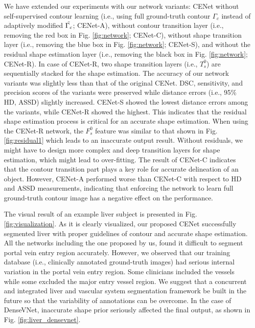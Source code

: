 \documentclass[journal]{IEEEtran}
\begin{document}
We have extended our experiments with our network variants: CENet without self-supervised contour learning (i.e., using full ground-truth contour $\Gamma_c$ instead of adaptively modified $\Tilde{\Gamma_c}$; CENet-A), without contour transition layer (i.e., removing the red box in Fig. \ref{fig:network}; CENet-C), without shape transition layer (i.e., removing the blue box in Fig. \ref{fig:network}; CENet-S), and without the residual shape estimation layer (i.e., removing the black box in Fig. \ref{fig:network}; CENet-R). In case of CENet-R, two shape transition layers (i.e., \(T^0_s\)) are sequentially stacked for the shape estimation. The accuracy of our network variants was slightly less than that of the original CENet. DSC, sensitivity, and precision scores of the variants were preserved while distance errors (i.e., 95\% HD, ASSD) slightly increased. CENet-S showed the lowest distance errors among the variants, while CENet-R showed the highest. This indicates that the residual shape estimation process is critical for an accurate shape estimation. When using the CENet-R network, the \(F^0_s\) feature was similar to that shown in Fig. \ref{fig:residual1} which leads to an inaccurate output result. Without residuals, we might have to design more complex and deep transition layers for shape estimation, which might lead to over-fitting. The result of CENet-C indicates that the contour transition part plays a key role for accurate delineation of an object. However, CENet-A performed worse than CENet-C with respect to HD and ASSD measurements, indicating that enforcing the network to learn full ground-truth contour image has a negative effect on the performance.\par
The visual result of an example liver subject is presented in Fig. \ref{fig:visualization}. As it is clearly visualized, our proposed CENet successfully segmented liver with proper guidelines of contour and accurate shape estimation. All the networks including the one proposed by us, found it difficult to segment portal vein entry region accurately. However, we observed that our training database (i.e., clinically annotated ground-truth images) had serious internal variation in the portal vein entry region. Some clinicians included the vessels while some excluded the major entry vessel region. We suggest that a concurrent and integrated liver and vascular system segmentation framework be built in the future so that the variability of annotations can be overcome. In the case of DenseVNet, inaccurate shape prior seriously affected the final output, as shown in Fig. \ref{fig:liver_densevnet}.
\end{document}
